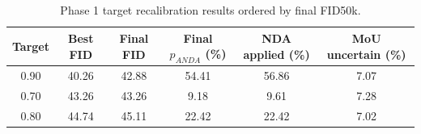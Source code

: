 \begin{table}[t]
\centering
\caption{Phase 1 target recalibration results ordered by final FID50k.}
\label{tab:phase1_final_fid}
\begin{tabular}{cccccc}
\hline
Target & Best FID & Final FID & Final $p_{ANDA}$ (\%) & NDA applied (\%) & MoU uncertain (\%) \\
\hline
0.90 & 40.26 & 42.88 & 54.41 & 56.86 & 7.07 \\
0.70 & 43.26 & 43.26 & 9.18 & 9.61 & 7.28 \\
0.80 & 44.74 & 45.11 & 22.42 & 22.42 & 7.02 \\
\hline
\end{tabular}
\end{table}
